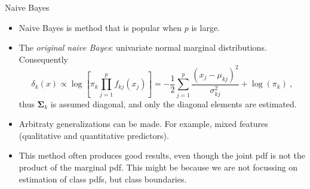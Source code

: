 \documentclass[
  10pt,
  ignorenonframetext,
]{beamer}
\providecommand{\tightlist}{%
  \setlength{\itemsep}{0pt}\setlength{\parskip}{0pt}}
\begin{document}
\begin{frame}
\begin{block}{Naive Bayes}
\protect\hypertarget{naive-bayes}{}
\vspace{2mm}

\begin{itemize}
\tightlist
\item
  Naive Bayes is method that is popular when \(p\) is large.
\end{itemize}

\vspace{2mm}

\begin{itemize}
\tightlist
\item
  The \emph{original naive Bayes}: univariate normal marginal
  distributions. Consequently
  \[\delta_k (x) \propto \log \left[ \pi_k \prod_{j=1}^p f_{kj}(x_j) \right] = - \frac{1}{2} \sum_{j=1}^p \frac{(x_j - \mu_{kj})^2}{\sigma_{kj}^2} + \log(\pi_k) \ , \]
  thus \(\boldsymbol{\Sigma}_k\) is assumed diagonal, and only the
  diagonal elements are estimated.
\end{itemize}

\vspace{2mm}

\begin{itemize}
\tightlist
\item
  Arbitraty generalizations can be made. For example, mixed features
  (qualitative and quantitative predictors).
\end{itemize}

\vspace{2mm}

\begin{itemize}
\tightlist
\item
  This method often produces good results, even though the joint pdf is
  not the product of the marginal pdf. This might be because we are not
  focussing on estimation of class pdfs, but class boundaries.
\end{itemize}
\end{block}
\end{frame}
\end{document}
